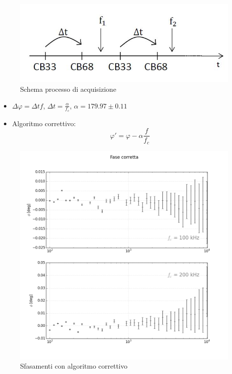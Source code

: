 \begin{frame}
\begin{figure}
\centering
\includegraphics[width=0.9\linewidth]{immagine}
\caption{Schema processo di acquisizione}
\label{fig:schema}
\end{figure}
\begin{itemize}
\item $\Delta \varphi = \Delta tf$, $\Delta t = \frac{\alpha}{f_c}$, $\alpha = 179.97 \pm 0.11$
\item Algoritmo correttivo:\\
\begin{equation}
\varphi ' = \varphi - \alpha \frac{f}{f_c}
\end{equation}
\end{itemize}
\end{frame}

\begin{frame}
\begin{figure}
\includegraphics[width=0.9\linewidth]{subplots_errors}
\caption{Sfasamenti con algoritmo correttivo}
\label{fig:sfasacorret}
\end{figure}
\end{frame}